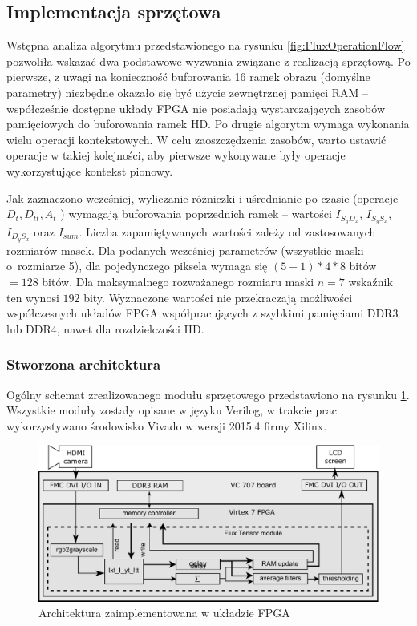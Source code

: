 \documentclass[10pt,a4paper]{article}
\begin{document}
\subsection{Implementacja sprzętowa}

Wstępna analiza algorytmu przedstawionego na rysunku \ref{fig:FluxOperationFlow} pozwoliła wskazać dwa podstawowe wyzwania związane z realizacją sprzętową.
Po pierwsze, z uwagi na konieczność buforowania 16 ramek obrazu (domyślne parametry) niezbędne okazało się być użycie zewnętrznej pamięci RAM -- współcześnie dostępne układy FPGA nie posiadają wystarczających zasobów pamięciowych do buforowania ramek HD. Po drugie algorytm wymaga wykonania wielu operacji kontekstowych. W celu zaoszczędzenia zasobów, warto ustawić operacje w takiej kolejności, aby pierwsze wykonywane były operacje wykorzystujące kontekst pionowy.

Jak zaznaczono wcześniej, wyliczanie różniczki i uśrednianie po czasie (operacje $D_t, D_{tt}, A_t$ ) wymagają buforowania poprzednich ramek --  wartości $I_{S_yD_x}$, $I_{S_yS_x}$, $I_{D_yS_x}$ oraz $I_{sum}$. 
Liczba zapamiętywanych wartości zależy od zastosowanych rozmiarów masek. 
Dla podanych wcześniej parametrów (wszystkie maski o~rozmiarze 5), dla pojedynczego piksela wymaga się $(5-1)*4*8$ bitów $= 128$ bitów.
Dla maksymalnego rozważanego rozmiaru maski $n=7$ wskaźnik ten wynosi $192$ bity.
Wyznaczone wartości nie przekraczają możliwości współczesnych układów FPGA współpracujących z szybkimi pamięciami DDR3 lub DDR4, nawet dla rozdzielczości HD.

\subsubsection{Stworzona architektura}

Ogólny schemat zrealizowanego modułu sprzętowego przedstawiono na rysunku \ref{fig:jpk_FluxMainFlow}.
Wszystkie moduły zostały opisane w języku Verilog, w trakcie prac wykorzystywano środowisko Vivado w wersji 2015.4 firmy Xilinx.

\begin{figure}[h!]
	\centering
	\includegraphics[width=12cm]{img/flux_architecture.pdf}
	\caption{Architektura zaimplementowana w układzie FPGA}
	\label{fig:jpk_FluxMainFlow}
\end{figure}
\end{document}
